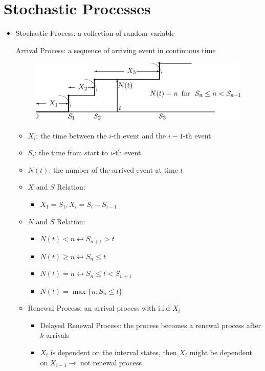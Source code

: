 \documentclass[a4paper]{article}
\begin{document}
\section{Stochastic Processes}
\begin{itemize}
    \item Stochastic Process: a collection of random variable

        Arrival Process: a sequence of arriving event in continuous time
\begin{figure} [H]
    \includegraphics[width=0.5\linewidth, center]{image/arrival_process.png}
\end{figure}
        \begin{itemize}
            \item $X_i$: the time between the $i$-th event and the $i-1$-th event
            \item $S_i$: the time from start to $i$-th event
            \item $N(t)$: the number of the arrived event at time $t$
            \item $X$ and $S$ Relation:
                \begin{itemize}
                    \item $X_1 = S_1, X_i = S_i - S_{i-1}$
                \end{itemize}
            \item $N$ and $S$ Relation:
                \begin{itemize}
                    \item $N(t) < n \leftrightarrow S_{n+1} > t$
                    \item $N(t) \geq n \leftrightarrow S_n \leq t$
                    \item $N(t) = n \leftrightarrow S_n \leq t < S_{n+1}$
                    \item $N(t) = \max \{n: S_n \leq t\}$
                \end{itemize}
            \item Renewal Process: an arrival process with i.i.d $X_i$
                \begin{itemize}
                    \item Delayed Renewal Process: the process becomes a renewal process after $k$ arrivals
                    \item $X_i$ is dependent on the interval states, then $X_i$ might be dependent on $X_{i-1} \rightarrow$ not renewal process

\end{itemize}
\end{itemize}
\end{itemize}
\end{document}

